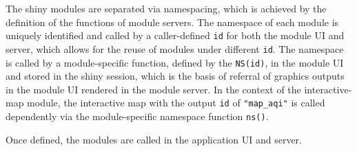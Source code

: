 \documentclass{aucklandthesis}
\begin{document}
\begin{Shaded}
\begin{Highlighting}[]
\StringTok{ }
\StringTok{ }
  \NormalTok{(}\NormalTok{(}\NormalTok{(}\NormalTok{), } \NormalTok{))}
\NormalTok{\}}

\StringTok{ }
\StringTok{ }
\NormalTok{    output[[}\NormalTok{]] <-}\StringTok{ }
\NormalTok{  \}}
\NormalTok{\}}
\end{Highlighting}
\end{Shaded}

The shiny modules are separated via namespacing, which is achieved by the definition of the functions of module servers. The namespace of each module is uniquely identified and called by a caller-defined \texttt{id} for both the module UI and server, which allows for the reuse of modules under different \texttt{id}. The namespace is called by a module-specific function, defined by the \texttt{NS(id)}, in the module UI and stored in the shiny session, which is the basis of referral of graphics outputs in the module UI rendered in the module server. In the context of the interactive-map module, the interactive map with the output \texttt{id} of \texttt{"map\_aqi"} is called dependently via the module-specific namespace function \texttt{ns()}.

Once defined, the modules are called in the application UI and server.

\begin{Shaded}
\begin{Highlighting}[]
\StringTok{ }
  \NormalTok{(}
\NormalTok{\}}

\StringTok{ }\NormalTok{(}
   \NormalTok{(}
      \NormalTok{(}\NormalTok{(}\NormalTok{(}\NormalTok{))),}
\NormalTok{    ),}
\NormalTok{  )}
\NormalTok{)}
\end{Highlighting}
\end{Shaded}
\end{document}
